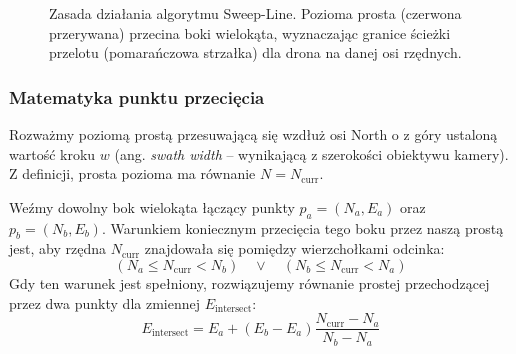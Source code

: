 \begin{figure}[ht]
    \centering
    \caption{Zasada działania algorytmu Sweep-Line. Pozioma prosta (czerwona przerywana) przecina boki wielokąta, wyznaczając granice ścieżki przelotu (pomarańczowa strzałka) dla drona na danej osi rzędnych.}
    \label{fig:sweepline}
\end{figure}

\subsubsection{Matematyka punktu przecięcia}
Rozważmy poziomą prostą przesuwającą się wzdłuż osi North o z góry ustaloną wartość kroku $w$ (ang. \textit{swath width} -- wynikającą z szerokości obiektywu kamery). Z definicji, prosta pozioma ma równanie $N = N_{\text{curr}}$. 

Weźmy dowolny bok wielokąta łączący punkty $p_a = (N_a, E_a)$ oraz $p_b = (N_b, E_b)$. Warunkiem koniecznym przecięcia tego boku przez naszą prostą jest, aby rzędna $N_{\text{curr}}$ znajdowała się pomiędzy wierzchołkami odcinka:
\begin{equation}
    (N_a \le N_{\text{curr}} < N_b) \quad \lor \quad (N_b \le N_{\text{curr}} < N_a)
\end{equation}
Gdy ten warunek jest spełniony, rozwiązujemy równanie prostej przechodzącej przez dwa punkty dla zmiennej $E_{\text{intersect}}$:
\begin{equation}
    E_{\text{intersect}} = E_a + (E_b - E_a) \frac{N_{\text{curr}} - N_a}{N_b - N_a}
\end{equation}

